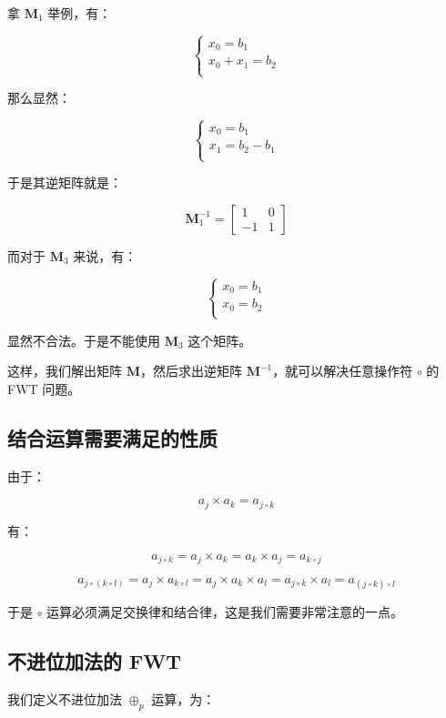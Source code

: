 \documentclass[12pt]{article} %
\begin{document}
拿 $\mathbf{M}_1$ 举例，有：

$$
\begin{cases}
    x_0 = b_1 \\
    x_0 + x_1 =b_2 \\
\end{cases}
$$

那么显然：

$$
\begin{cases}
    x_0 = b_1 \\
    x_1 = b_2-b_1 \\
\end{cases}
$$

于是其逆矩阵就是：

$$\mathbf{M}_1^{-1}=\begin{bmatrix} 1 & 0 \\ -1 & 1 \end{bmatrix}$$

而对于 $\mathbf{M}_3$ 来说，有：

$$
\begin{cases}
    x_0 = b_1 \\
    x_0 = b_2 \\
\end{cases}
$$

显然不合法。于是不能使用 $\mathbf{M}_3$ 这个矩阵。

这样，我们解出矩阵 $\mathbf{M}$，然后求出逆矩阵 $\mathbf{M}^{-1}$，就可以解决任意操作符 $\circ$ 的 FWT 问题。

\subsection{结合运算需要满足的性质} %

由于：

$$a_{j} \times a_{k}=a_{j \circ k}$$

有：

$$
a_{j \circ k}=a_j \times a_k=a_k \times a_j=a_{k \circ j}
$$

$$
a_{j \circ (k \circ l)}=a_j \times a_{k \circ l}=a_j \times a_k \times a_l=a_{j \circ k} \times a_{l}=a_{(j \circ k)\circ l}
$$

于是 $\circ$ 运算必须满足交换律和结合律，这是我们需要非常注意的一点。

\subsection{不进位加法的 FWT}

我们定义不进位加法 $\oplus_p$ 运算，为：
\end{document}

